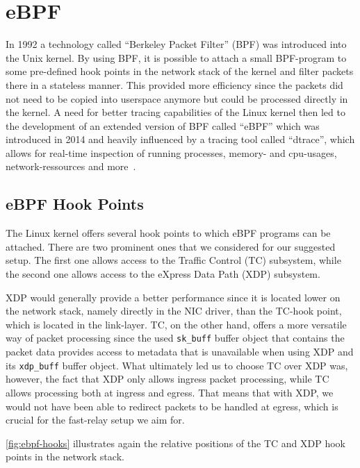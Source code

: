\section{eBPF}\label{sec:ebpf_bg}
In 1992 a technology called ``Berkeley Packet Filter'' (BPF) was introduced into 
the Unix kernel.
By using BPF, it is possible to attach a small BPF-program to some pre-defined hook points in 
the network stack of the kernel and filter packets there in a stateless manner.
This provided more efficiency since the packets did not need to be copied into 
userspace anymore but could be processed directly in the kernel.
A need for better tracing capabilities of the Linux kernel then led to the development 
of an extended version of BPF called ``eBPF'' which was introduced in 2014 and 
heavily influenced by a tracing tool called ``dtrace'', which allows for 
real-time inspection of running processes, memory- and cpu-usages, network-ressources 
and more~\parencite{ebpf-intro-tigera}.

\subsection{eBPF Hook Points}
The Linux kernel offers several hook points to which eBPF programs can be attached.
There are two prominent ones that we considered for our suggested setup.
The first one allows access to the Traffic Control (TC) subsystem, while the 
second one allows access to the eXpress Data Path (XDP) subsystem.

XDP would generally provide a better performance since it is located 
lower on the network stack, namely directly in the NIC driver, than the 
TC-hook point, which is located in the link-layer.
TC, on the other hand, offers a more versatile way of packet processing since 
the used \verb|sk_buff| buffer object that contains the packet data provides access to 
metadata that is unavailable when using XDP and its \verb|xdp_buff| buffer object.
What ultimately led us to choose TC over XDP was, however, the fact that 
XDP only allows ingress packet processing, while TC allows processing both
at ingress and egress.
That means that with XDP, we would not have been able to redirect packets to be handled 
at egress, which is crucial for the fast-relay setup we aim for. %

\autoref{fig:ebpf-hooks} illustrates again the relative positions of the TC and
XDP hook points in the network stack.

